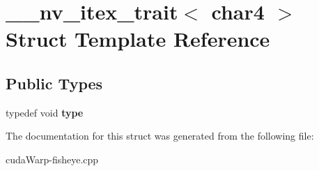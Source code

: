 \hypertarget{struct____nv__itex__trait_3_01char4_01_4}{}\section{\+\_\+\+\_\+nv\+\_\+itex\+\_\+trait$<$ char4 $>$ Struct Template Reference}
\label{struct____nv__itex__trait_3_01char4_01_4}
\subsection*{Public Types}
\begin{DoxyCompactItemize}
\item 
typedef void {\bfseries type}\hypertarget{struct____nv__itex__trait_3_01char4_01_4_afd718895baf25afb98a810c922e45164}{}\label{struct____nv__itex__trait_3_01char4_01_4_afd718895baf25afb98a810c922e45164}

\end{DoxyCompactItemize}


The documentation for this struct was generated from the following file\+:\begin{DoxyCompactItemize}
\item 
cuda\+Warp-\/fisheye.\+cpp\end{DoxyCompactItemize}
